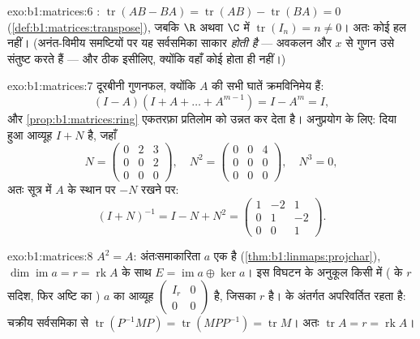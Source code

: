 \begin{solution}{exo:b1:matrices:6}
: $\operatorname{tr}(AB - BA) = \operatorname{tr}(AB) -
\operatorname{tr}(BA) = 0$ (\cref{def:b1:matrices:transpose}), जबकि $\R$
अथवा $\C$ में $\operatorname{tr}(I_n) = n \neq 0$। अतः कोई हल नहीं।
(अनंत-विमीय समष्टियों पर यह सर्वसमिका साकार \emph{होती है} --- अवकलन और $x$
से गुणन उसे संतुष्ट करते हैं --- और ठीक इसीलिए, क्योंकि वहाँ कोई  होता
ही नहीं।)
\end{solution}

\begin{solution}{exo:b1:matrices:7}
दूरबीनी गुणनफल, क्योंकि $A$ की सभी घातें क्रमविनिमेय हैं:
\[
(I - A)(I + A + \dots + A^{m-1}) = I - A^m = I ,
\]
और \cref{prop:b1:matrices:ring} एकतरफ़ा प्रतिलोम को उन्नत कर देता है।
अनुप्रयोग के लिए: दिया हुआ आव्यूह $I + N$ है, जहाँ
\[
N = \begin{pmatrix} 0 & 2 & 3\\ 0 & 0 & 2\\ 0&0&0 \end{pmatrix},
\quad
N^2 = \begin{pmatrix} 0&0&4\\ 0&0&0\\ 0&0&0\end{pmatrix},
\quad N^3 = 0 ,
\]
अतः सूत्र में $A$ के स्थान पर $-N$ रखने पर:
\[
(I + N)^{-1} = I - N + N^2 =
\begin{pmatrix}
1 & -2 & 1\\
0 & 1 & -2\\
0 & 0 & 1
\end{pmatrix}.
\]
\end{solution}

\begin{solution}{exo:b1:matrices:8}
$A^2 = A$: अंतःसमाकारिता $a$ एक  है
(\cref{thm:b1:linmaps:projchar}), $\dim\operatorname{im} a = r =
\operatorname{rk} A$ के साथ $E = \operatorname{im} a \oplus \ker a$। इस
विघटन के अनुकूल किसी  में ( के $r$ सदिश, फिर अष्टि का ) $a$
का आव्यूह $\begin{pmatrix} I_r & 0\\ 0 & 0\end{pmatrix}$ है, जिसका 
$r$ है।   के अंतर्गत अपरिवर्तित रहता है: चक्रीय सर्वसमिका
से $\operatorname{tr}(P^{-1}MP) = \operatorname{tr}(MPP^{-1}) =
\operatorname{tr} M$। अतः $\operatorname{tr} A = r = \operatorname{rk} A$।
\end{solution}

